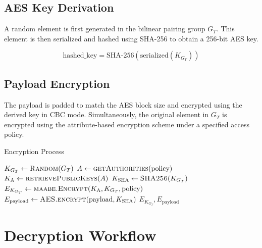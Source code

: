 \documentclass[cic,tc,english]{iiufrgs}
\begin{document}
        \subsection{AES Key Derivation}

            A random element is first generated in the bilinear pairing group $G_T$. This element is then serialized and hashed using SHA-256 to obtain a 256-bit AES key.

            \begin{equation}
            \text{hashed\_key} = \text{SHA-256}(\text{serialized}(K_{G_T}))
            \end{equation}

        \subsection{Payload Encryption}

            The payload is padded to match the AES block size and encrypted using the derived key in CBC mode. Simultaneously, the original element in $G_T$ is encrypted using the attribute-based encryption scheme under a specified access policy.

            \begin{algorithm}
                \caption{Encryption Process}
                \label{alg:encryption_process}
                \scriptsize
                \begin{algorithmic}[1]
                    \State $K_{G_T} \gets \textsc{Random}(G_T)$
                    \State $A \gets \textsc{getAuthorities}(\text{policy})$
                    \State $K_{\textsc{A}} \gets \textsc{retrievePublicKeys}(A)$
                    \State $K_{\textsc{SHA}} \gets \textsc{SHA256}(K_{G_T})$
                    \State $E_{K_{G_T}} \gets \textsc{maabe.Encrypt}(K_{\textsc{A}}, K_{G_T}, \text{policy})$
                    \State $E_{\text{payload}} \gets \textsc{AES.encrypt}(\text{payload}, K_{\textsc{SHA}})$
                    \State \Return $E_{K_{G_T}}, E_{\text{payload}}$
                \EndProcedure
                \end{algorithmic}
            \end{algorithm}

    \section{Decryption Workflow}
    \label{sec:decryption-workflow}
\end{document}
